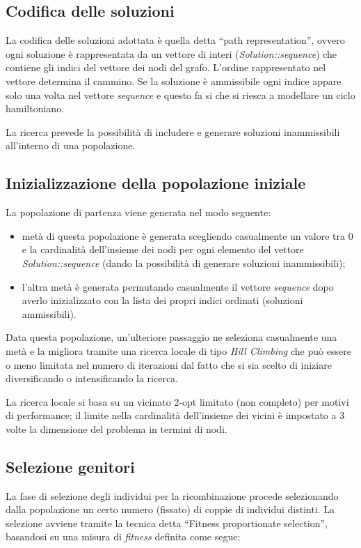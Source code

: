 \documentclass[a4paper]{article}
\begin{document}
        \subsection{Codifica delle soluzioni}
            La codifica delle soluzioni adottata \`e quella detta ``path representation'', ovvero
            ogni soluzione \`e rappresentata da un vettore di interi (\emph{Solution::sequence}) che contiene
            gli indici del vettore dei nodi del grafo. L'ordine rappresentato nel vettore determina il cammino.
            Se la soluzione \`e ammissibile ogni indice appare solo una volta nel vettore \emph{sequence} e questo fa si che si riesca a modellare
            un ciclo hamiltoniano.

            La ricerca prevede la possibilit\`a di includere e generare soluzioni inammissibili all'interno di una popolazione.

        \subsection{Inizializzazione della popolazione iniziale}
            La popolazione di partenza viene generata nel modo seguente:
            \begin{itemize}
                \item met\`a di questa popolazione \`e generata scegliendo casualmente un valore tra 0 e la cardinalit\`a dell'insieme dei nodi per ogni elemento del vettore \emph{Solution::sequence} (dando la possibilit\`a di generare soluzioni inammissibili);
                \item l'altra met\`a \`e generata permutando casualmente il vettore \emph{sequence} dopo averlo inizializzato con la lista dei propri indici ordinati (soluzioni ammissibili).
            \end{itemize}
            Data questa popolazione, un'ulteriore passaggio ne seleziona casualmente una met\`a e la migliora tramite una
            ricerca locale di tipo \emph{Hill Climbing} che pu\`o essere o meno limitata nel numero di iterazioni
            dal fatto che si sia scelto di iniziare diversificando o intensificando la ricerca.

            La ricerca locale si basa su un vicinato 2-opt limitato (non completo) per motivi di performance; il limite nella cardinalit\`a
            dell'insieme dei vicini \`e impostato a 3 volte la dimensione del problema in termini di nodi.

        \subsection{Selezione genitori}
            La fase di selezione degli individui per la ricombinazione procede selezionando dalla popolazione un certo numero
            (fissato) di coppie di individui distinti.
            La selezione avviene tramite la tecnica detta ``Fitness proportionate selection'', basandosi su una misura di \emph{fitness}
            definita come segue:
\end{document}
